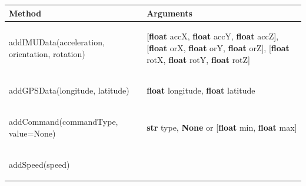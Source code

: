 \documentclass[]{scrreprt}
\begin{document}
	\begin{table}[H]
		
		\centering
		\begin{tabular}{|l|l|}
			\hline 
			Method & Arguments \\ 
			\hline \hline
			\begin{pbox}{6.0cm}{\vspace{.2\baselineskip}
					addIMUData(acceleration, orientation, rotation)
					\vspace{.3\baselineskip}} \end{pbox}&\begin{pbox}{6.0cm}{\vspace{.2\baselineskip}
					[\textbf{float} accX, \textbf{float} accY, \textbf{float} accZ],
					[\textbf{float} orX, \textbf{float} orY, \textbf{float} orZ],
					[\textbf{float} rotX, \textbf{float} rotY, \textbf{float} rotZ]
					\vspace{.3\baselineskip}} \end{pbox}\\ 
			\hline 
			\begin{pbox}{6.0cm}{\vspace{.2\baselineskip}
					addGPSData(longitude, latitude)
					\vspace{.3\baselineskip}} \end{pbox}&\begin{pbox}{6.0cm}{\vspace{.2\baselineskip}
					\textbf{float} longitude, \textbf{float} latitude
					\vspace{.3\baselineskip}} \end{pbox}\\ 
			\hline 
			\begin{pbox}{6.0cm}{\vspace{.2\baselineskip}
					addCommand(commandType, value=None)
					\vspace{.3\baselineskip}}
			\end{pbox}&
			\begin{pbox}{6.0cm}{\vspace{.2\baselineskip}
					\textbf{str} type, \textbf{None} or [\textbf{float} min, \textbf{float} max] 
					\vspace{.3\baselineskip}}
			\end{pbox}\\ 
			\hline 
			\begin{pbox}{6.0cm}{\vspace{.2\baselineskip}
					addSpeed(speed)	
					\vspace{.3\baselineskip}} 

\end{pbox}
\end{tabular}
\end{table}
\end{document}
